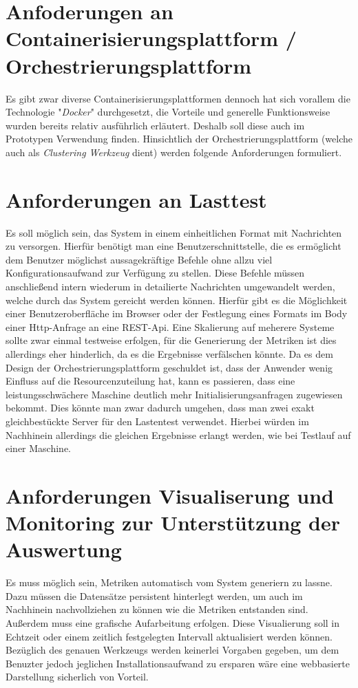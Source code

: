 \section{Anfoderungen an Containerisierungsplattform / Orchestrierungsplattform}
Es gibt zwar diverse Containerisierungsplattformen  dennoch hat sich vorallem die Technologie "\emph{Docker}" durchgesetzt, die Vorteile und generelle Funktionsweise wurden bereits relativ ausführlich erläutert. Deshalb soll diese auch im Prototypen Verwendung finden. Hinsichtlich der Orchestrierungsplattform (welche auch als \emph{Clustering Werkzeug} dient) werden folgende Anforderungen formuliert. 


\section{Anforderungen an Lasttest}
Es soll möglich sein, das System in einem einheitlichen Format mit Nachrichten zu versorgen. Hierfür benötigt man eine Benutzerschnittstelle, die es ermöglicht dem Benutzer möglichst aussagekräftige Befehle ohne allzu viel Konfigurationsaufwand zur Verfügung zu stellen. Diese Befehle müssen anschließend intern wiederum in detailierte Nachrichten umgewandelt werden, welche durch das System gereicht werden können. Hierfür gibt es die Möglichkeit einer Benutzeroberfläche im Browser oder der Festlegung eines Formats im Body einer Http-Anfrage an eine REST-Api. Eine Skalierung auf meherere Systeme sollte zwar einmal testweise erfolgen, für die Generierung der Metriken ist dies allerdings eher hinderlich, da es die Ergebnisse verfälschen könnte. Da es dem Design der Orchestrierungsplattform geschuldet ist, dass der Anwender wenig Einfluss auf die Resourcenzuteilung hat, kann es passieren, dass eine leistungsschwächere Maschine deutlich mehr Initialisierungsanfragen zugewiesen bekommt. Dies könnte man zwar dadurch umgehen, dass man zwei exakt gleichbestückte Server für den Lastentest verwendet. Hierbei würden im Nachhinein allerdings die gleichen Ergebnisse erlangt werden, wie bei Testlauf auf einer Maschine.

\section{Anforderungen Visualiserung und Monitoring zur Unterstützung der Auswertung}
Es muss möglich sein, Metriken automatisch vom System generiern zu lassne. Dazu müssen die Datensätze persistent hinterlegt werden, um auch im Nachhinein nachvollziehen zu können wie die Metriken entstanden sind. Außerdem muss eine grafische Aufarbeitung erfolgen. Diese Visualierung soll in Echtzeit oder einem zeitlich festgelegten Intervall aktualisiert werden können. Bezüglich des genauen Werkzeugs werden keinerlei Vorgaben gegeben, um dem Benuzter jedoch jeglichen Installationsaufwand zu ersparen wäre eine webbasierte Darstellung sicherlich von Vorteil.
